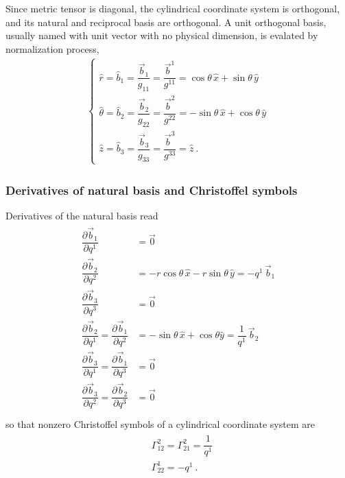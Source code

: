 \documentclass[letterpaper,10pt,english]{jupyterBook}
\begin{document}
\sphinxAtStartPar
Since metric tensor is diagonal, the cylindrical coordinate system is orthogonal, and its natural and reciprocal basis are orthogonal. A unit orthogonal basis, usually named  with unit vector with no physical dimension, is evalated by normalization process,
\begin{equation*}
\begin{split}\begin{cases}
  \hat{r}      = \hat{b}_1 = \dfrac{\vec{b}_1}{g_{11}} = \dfrac{\vec{b}^1}{g^{11}} =  \cos \theta \, \hat{x} + \sin \theta \, \hat{y} \\
  \hat{\theta} = \hat{b}_2 = \dfrac{\vec{b}_2}{g_{22}} = \dfrac{\vec{b}^2}{g^{22}} = -\sin \theta \, \hat{x} + \cos \theta \, \hat{y} \\
  \hat{z}      = \hat{b}_3 = \dfrac{\vec{b}_3}{g_{33}} = \dfrac{\vec{b}^3}{g^{33}} =  \hat{z} \ .
\end{cases}\end{split}
\end{equation*}\subsubsection*{Derivatives of natural basis and Christoffel symbols}

\sphinxAtStartPar
Derivatives of the natural basis read
\begin{equation*}
\begin{split}\begin{aligned}
 \dfrac{\partial \vec{b}_1}{\partial q^1} & = \vec{0} \\
 \dfrac{\partial \vec{b}_2}{\partial q^2} & = -r \cos \theta \, \hat{x} - r \sin \theta \, \hat{y} = - q^1 \, \vec{b}_1 \\
 \dfrac{\partial \vec{b}_3}{\partial q^3} & = \vec{0} \\
 \dfrac{\partial \vec{b}_2}{\partial q^1} = \dfrac{\partial \vec{b}_1}{\partial q^2} & = -\sin \theta \, \hat{x} + \cos \theta \hat{y} = \dfrac{1}{q^1} \, \vec{b}_2 \\
 \dfrac{\partial \vec{b}_3}{\partial q^1} = \dfrac{\partial \vec{b}_1}{\partial q^3} & = \vec{0} \\
 \dfrac{\partial \vec{b}_3}{\partial q^2} = \dfrac{\partial \vec{b}_2}{\partial q^3} & = \vec{0} \\
\end{aligned}\end{split}
\end{equation*}
\sphinxAtStartPar
so that non\sphinxhyphen{}zero Christoffel symbols of a cylindrical coordinate system are
\begin{equation*}
\begin{split}\begin{aligned}
  & \Gamma_{12}^{2} = \Gamma_{21}^2 = \dfrac{1}{q^1} \\
  & \Gamma_{22}^{1} = - q^1 \ .
\end{aligned}\end{split}
\end{equation*}
\end{document}
